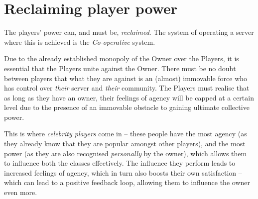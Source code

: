 \section{Reclaiming player power}
The players’ power can, and must be, \emph{reclaimed}. The system of operating a server where this is achieved is the \emph{Co-operative} system.

Due to the already established monopoly of the Owner over the Players, it is essential that the Players unite against the Owner. There must be no doubt between players that what they are against is an (almost) immovable force who has control over \emph{their} server and \emph{their} community. The Players must realise that as long as they have an owner, their feelings of agency will be capped at a certain level due to the presence of an immovable obstacle to gaining ultimate collective power.

This is where \emph{celebrity players} come in – these people have the most agency (as they already know that they are popular amongst other players), and the most power (as they are also recognised \emph{personally} by the owner), which allows them to influence both the classes effectively. The influence they perform leads to increased feelings of agency, which in turn also boosts their own satisfaction – which can lead to a positive feedback loop, allowing them to influence the owner even more.

